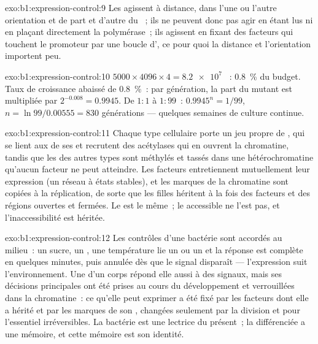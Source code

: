 \begin{solution}{exo:b1:expression-control:9}
Les  agissent à distance, dans l'une ou l'autre
orientation et de part et d'autre du ~; ils ne peuvent donc pas
agir en étant lus ni en plaçant directement la polymérase~; ils agissent
en fixant des facteurs qui touchent le promoteur par une boucle d',
ce pour quoi la distance et l'orientation importent peu.
\end{solution}

\begin{solution}{exo:b1:expression-control:10}
$5000\times 4096\times 4 = \num{8.2e7}$ ~: \qty{0.8}{\%} du budget.
Taux de croissance abaissé de \qty{0.8}{\%}~: par génération, la part du
mutant est multipliée par $2^{-0.008} = 0.9945$. De $1:1$ à
$1:99$~: $0.9945^n = 1/99$, $n = \ln 99/0.00555 = 830$ générations ---
quelques semaines de culture continue.
\end{solution}

\begin{solution}{exo:b1:expression-control:11}
Chaque type cellulaire porte un jeu propre de ,
qui se lient aux  de ses  et recrutent des acétylases
qui en ouvrent la chromatine, tandis que les  des autres types sont
méthylés et tassés dans une hétérochromatine qu'aucun facteur ne peut
atteindre. Les facteurs entretiennent mutuellement leur expression (un
réseau à états stables), et les marques de la chromatine sont copiées à
la réplication, de sorte que les filles héritent à la fois des facteurs
et des régions ouvertes et fermées. Le  est le même~; le 
accessible ne l'est pas, et l'inaccessibilité est héritée.
\end{solution}

\begin{solution}{exo:b1:expression-control:12}
Les contrôles d'une bactérie sont accordés au milieu~: un sucre, un
, une température lie un  ou un  et la
réponse est complète en quelques minutes, puis annulée dès que le signal
disparaît --- l'expression suit l'environnement. Une  d'un corps
répond elle aussi à des signaux, mais ses décisions principales ont été
prises au cours du développement et verrouillées dans la chromatine~: ce
qu'elle peut exprimer a été fixé par les facteurs dont elle a hérité et
par les marques de son , changées seulement par la division et pour
l'essentiel irréversibles. La bactérie est une lectrice du présent~; la
 différenciée a une mémoire, et cette mémoire est son identité.
\end{solution}


